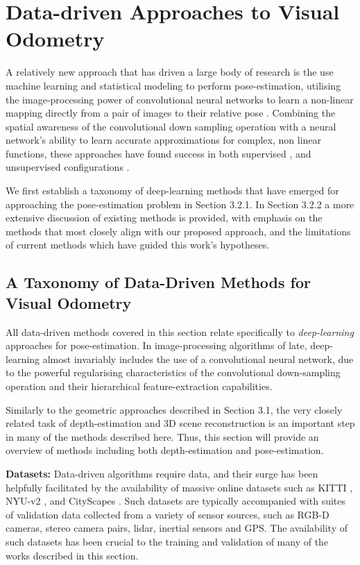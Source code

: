 \section{Data-driven Approaches to Visual Odometry}

A relatively new approach that has driven a large body of research is the use machine learning and statistical modeling to perform pose-estimation, utilising the image-processing power of convolutional neural networks to learn a non-linear mapping directly from a pair of images to their relative pose \cite{eigen2014supervised, garg2016unsupervised,godard2016consistency, liu2015supervised, zhou2017unsupervised}.  Combining the spatial awareness of the convolutional down sampling operation with a neural network's ability to learn accurate approximations for complex, non linear functions, these approaches have found success in both supervised \cite{eigen2014supervised, liu2015supervised}, and unsupervised configurations \cite{garg2016unsupervised, godard2016consistency, zhou2017unsupervised}. 


We first establish a taxonomy of deep-learning methods that have emerged for approaching the pose-estimation problem in Section 3.2.1. In Section 3.2.2 a more extensive discussion of existing methods is provided, with emphasis on the methods that most closely align with our proposed approach, and the limitations of current methods which have guided this work's hypotheses. 


\subsection{A Taxonomy of Data-Driven Methods for Visual Odometry}

All data-driven methods covered in this section relate specifically to \textit{deep-learning} approaches for pose-estimation. In image-processing algorithms of late, deep-learning almost invariably includes the use of a convolutional neural network, due to the powerful regularising characteristics of the convolutional down-sampling operation and their hierarchical feature-extraction capabilities. 

Similarly to the geometric approaches described in Section 3.1, the very closely related task of depth-estimation and 3D scene reconstruction is an important step in many of the methods described here. Thus, this section will provide an overview of methods including both depth-estimation and pose-estimation.

\textbf{Datasets: } Data-driven algorithms require data, and their surge has been helpfully facilitated by the availability of massive online datasets such as KITTI \cite{dataset-kitti}, NYU-v2 \cite{dataset-nyuv2}, and CityScapes \cite{dataset-cityscapes}. Such datasets are typically accompanied with suites of validation data collected from a variety of sensor sources, such as RGB-D cameras, stereo camera pairs, lidar, inertial sensors and GPS. The availability of such datasets has been crucial to the training and validation of many of the works described in this section.

